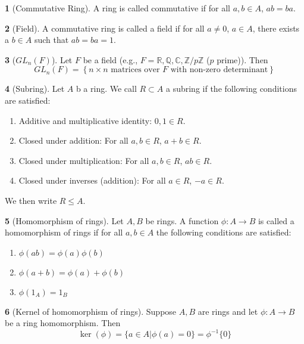 \documentclass[12pt]{article}
\theoremstyle{definition}
\newtheorem{definition}{\color{NavyBlue}{\textbf{Definition}}}
\newcommand{\Z}{\mathbb{Z}}
\begin{document}
\begin{definition}[Commutative Ring]
A ring is called commutative if for all $a,b \in A$, $ab = ba$.
\end{definition}

\begin{definition}[Field]
A commutative ring is called a field if for all $a \neq 0$, $a \in A$, there exists a $b \in A$ such that $ab = ba = 1$.
\end{definition}

\begin{definition}[$GL_n(F)$]
Let $F$ be a field (e.g., $F = \mathbb{R}, \mathbb{Q}, \mathbb{C}, \Z / p\Z $ ($p$ prime)). Then
\begin{equation}
GL_n(F) = \left\{ n \times n \text{ matrices over $F$ with non-zero determinant}\right\}
\end{equation}
\end{definition}

\begin{definition}[Subring]
Let $A$ b a ring. We call $R \subset A$ a subring if the following conditions are satisfied:
\begin{enumerate}
\item Additive and multiplicative identity: $0,1 \in R$.
\item Closed under addition: For all $a,b \in R$, $a+b \in R$.
\item Closed under multiplication: For all $a,b \in R$, $ab \in R$.
\item Closed under inverses (addition): For all $a \in R$, $-a \in R$.
\end{enumerate}
We then write $R \leq A$.
\end{definition}

\begin{definition}[Homomorphism of rings]
Let $A,B$ be rings. A function $\phi: A \to B$ is called a homomorphism of rings if for all $a,b \in A$ the following conditions are satisfied:
\begin{enumerate}
\item $\phi(ab) = \phi(a)\phi(b)$
\item $\phi(a+b) = \phi(a) + \phi(b)$
\item $\phi(1_A) = 1_B$
\end{enumerate}
\end{definition}

\begin{definition}[Kernel of homomorphism of rings]
Suppose $A,B$ are rings and let $\phi:A \to B$ be a ring homomorphism. Then
\begin{equation}
\ker(\phi) = \{a \in A | \phi(a) = 0\} = \phi^{-1}\{0\}
\end{equation}
\end{definition}
\end{document}

